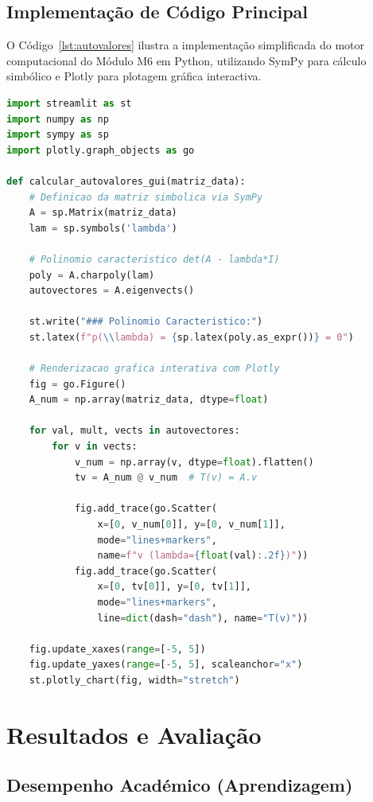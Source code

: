 \documentclass[conference]{IEEEtran}
\begin{document}
\subsection{Implementação de Código Principal}

O Código~\ref{lst:autovalores} ilustra a implementação simplificada do motor computacional do Módulo M6 em Python, utilizando SymPy para cálculo simbólico e Plotly para plotagem gráfica interactiva.

\begin{lstlisting}[language=Python, caption={Trecho de código Python do núcleo do Módulo M6 no LIDAL.}, label={lst:autovalores}]
import streamlit as st
import numpy as np
import sympy as sp
import plotly.graph_objects as go

def calcular_autovalores_gui(matriz_data):
    # Definicao da matriz simbolica via SymPy
    A = sp.Matrix(matriz_data)
    lam = sp.symbols('lambda')

    # Polinomio caracteristico det(A - lambda*I)
    poly = A.charpoly(lam)
    autovectores = A.eigenvects()

    st.write("### Polinomio Caracteristico:")
    st.latex(f"p(\\lambda) = {sp.latex(poly.as_expr())} = 0")

    # Renderizacao grafica interativa com Plotly
    fig = go.Figure()
    A_num = np.array(matriz_data, dtype=float)

    for val, mult, vects in autovectores:
        for v in vects:
            v_num = np.array(v, dtype=float).flatten()
            tv = A_num @ v_num  # T(v) = A.v

            fig.add_trace(go.Scatter(
                x=[0, v_num[0]], y=[0, v_num[1]],
                mode="lines+markers",
                name=f"v (lambda={float(val):.2f})"))
            fig.add_trace(go.Scatter(
                x=[0, tv[0]], y=[0, tv[1]],
                mode="lines+markers",
                line=dict(dash="dash"), name="T(v)"))

    fig.update_xaxes(range=[-5, 5])
    fig.update_yaxes(range=[-5, 5], scaleanchor="x")
    st.plotly_chart(fig, width="stretch")
\end{lstlisting}

\section{Resultados e Avaliação}

\subsection{Desempenho Académico (Aprendizagem)}
\end{document}
